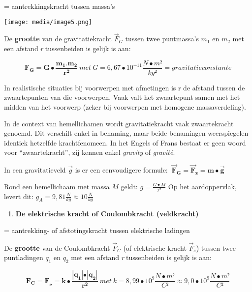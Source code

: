 \documentclass{ximera}
\begin{document}
= aantrekkingskracht tussen massa's

\texttt{[image: media/image5.png]}

De \textbf{grootte} van de gravitatiekracht \({\overrightarrow{F}}_{G}\)
tussen twee puntmassa's \(m_{1}\) en \(m_{2}\) met een afstand
\(r\ \)tussenbeiden is gelijk is aan:

\[\mathbf{F}_{\mathbf{G}}\mathbf{= G \bullet}\frac{\mathbf{m}_{\mathbf{1}}{\mathbf{.}\mathbf{m}}_{\mathbf{2}}}{\mathbf{r}^{\mathbf{2}}}\ met\ G = 6,67 \bullet 10^{- 11}\frac{N \bullet m²}{kg²} = gravitatieconstante\]

In realistische situaties bij voorwerpen met afmetingen is r de afstand
tussen de zwaartepunten van die voorwerpen. Vaak valt het zwaartepunt
samen met het midden van het voorwerp (zeker bij voorwerpen met homogene
massaverdeling).

In de context van hemellichamen wordt gravitatiekracht vaak
zwaartekracht genoemd. Dit verschilt enkel in benaming, maar beide
benamingen weerspiegelen identiek hetzelfde krachtfenomeen. In het
Engels of Frans bestaat er geen woord voor ``zwaartekracht'', zij kennen
enkel \emph{gravity} of \emph{gravité}.

In een gravitatieveld \(\overrightarrow{g}\) is er een eenvoudigere
formule:
\(\ {\overrightarrow{\mathbf{F}}}_{\mathbf{G}}\mathbf{=}{\overrightarrow{\mathbf{F}}}_{\mathbf{z}}\mathbf{= m \bullet}\overrightarrow{\mathbf{g}}\mathbf{\ }\)

Rond een hemellichaam met massa \(M\) geldt:
\(g = \frac{G \bullet M}{r²}\) Op het aardoppervlak, levert dit:
\(g_{A} = 9,81\frac{N}{kg} \approx 10\frac{N}{kg}\)

\begin{enumerate}
\def\labelenumi{\arabic{enumi}.}
\setcounter{enumi}{4}
\item
  \textbf{De elektrische kracht of Coulombkracht (veldkracht)}
\end{enumerate}

= aantrekking- of afstotingskracht tussen elektrische ladingen

De \textbf{grootte} van de Coulombkracht \({\overrightarrow{F}}_{C}\)
(of elektrische kracht \({\overrightarrow{F}}_{e}\)) tussen twee
puntladingen \(q_{1}\) en \(q_{2}\) met een afstand \(r\ \)tussenbeiden
is gelijk is aan:

\[{\mathbf{F}_{\mathbf{C}}\mathbf{=}\mathbf{F}}_{\mathbf{e}}\mathbf{= k \bullet}\frac{\left| \mathbf{q}_{\mathbf{1}} \right|\mathbf{\bullet}\left| \mathbf{q}_{\mathbf{2}} \right|}{\mathbf{r}^{\mathbf{2}}}\ met\ k = 8,99 \bullet 10^{9}\frac{N \bullet m²}{C²} \approx 9,0 \bullet 10^{9}\frac{N \bullet m²}{C²}\]
\end{document}
